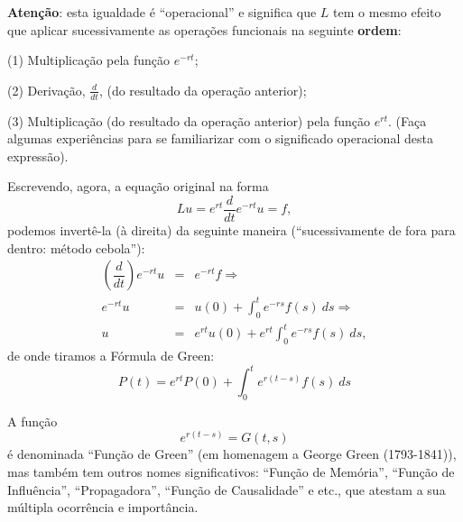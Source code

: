     \textbf{Atenção}: esta igualdade é ``operacional'' e significa que \(L\) tem o mesmo efeito que aplicar sucessivamente as operações funcionais na seguinte \textbf{ordem}:
    \begin{description}
    \item (1) Multiplicação pela função \(e^{-rt}\);
    \item (2) Derivação, \(\frac{d}{dt}\), (do resultado da operação anterior);
    \item (3) Multiplicação (do resultado da operação anterior) pela função \(e^{rt}\). (Faça algumas experiências para se familiarizar com o significado operacional desta expressão).
    \end{description}

    Escrevendo, agora, a equação original na forma
    \[Lu = e^{rt} \frac{d}{dt} e^{-rt} u = f,\]
    podemos invertê-la (à direita) da seguinte maneira (``sucessivamente de fora para dentro: método cebola''):
    \begin{eqnarray}
    \left(\dfrac{d}{dt}\right) e^{-rt} u &=& e^{-rt} f \Rightarrow \nonumber\\
    e^{-rt} u &=& u(0) + \int_{0}^{t} e^{-rs} f(s)\ ds \Rightarrow \nonumber\\
    u &=& e^{rt} u(0) + e^{rt} \int_{0}^{t} e^{-rs} f(s)\ ds, \nonumber
    \end{eqnarray}
    de onde tiramos a Fórmula de Green:
    \begin{equation}\label{eq:formulagreen}
    P(t) = e^{rt} P(0) + \int_{0}^{t} e^{r(t-s)} f(s)\ ds
    \end{equation}

    A função
    \begin{equation}\label{eq:funcaogreen}
    e^{r(t-s)} = G(t,s)
    \end{equation}
    é denominada ``Função de Green'' (em homenagem a George Green (1793-1841)), mas também tem outros nomes significativos: ``Função de Memória'', ``Função de Influência'', ``Propagadora'', ``Função de Causalidade'' e etc., que atestam a sua múltipla ocorrência e importância.

